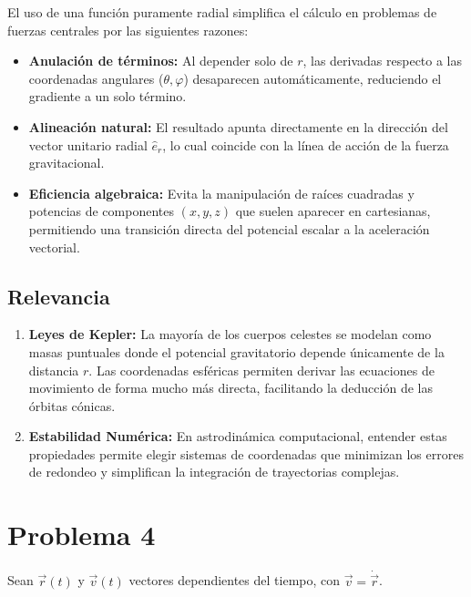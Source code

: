 \documentclass[12pt, letterpaper]{article}
\begin{document}
El uso de una función puramente radial simplifica el cálculo en problemas de fuerzas centrales por las siguientes razones:
\begin{itemize}
    \item \textbf{Anulación de términos:} Al depender solo de $r$, las derivadas respecto a las coordenadas angulares ($\theta, \varphi$) desaparecen automáticamente, reduciendo el gradiente a un solo término.
    \item \textbf{Alineación natural:} El resultado apunta directamente en la dirección del vector unitario radial $\hat{e}_r$, lo cual coincide con la línea de acción de la fuerza gravitacional.
    \item \textbf{Eficiencia algebraica:} Evita la manipulación de raíces cuadradas y potencias de componentes $(x, y, z)$ que suelen aparecer en cartesianas, permitiendo una transición directa del potencial escalar a la aceleración vectorial.
\end{itemize}

\subsection{Relevancia}

\begin{enumerate}
    \item \textbf{Leyes de Kepler:} La mayoría de los cuerpos celestes se modelan como masas puntuales donde el potencial gravitatorio depende únicamente de la distancia $r$. Las coordenadas esféricas permiten derivar las ecuaciones de movimiento de forma mucho más directa, facilitando la deducción de las órbitas cónicas.
    
    \item \textbf{Estabilidad Numérica:} En astrodinámica computacional, entender estas propiedades permite elegir sistemas de coordenadas que minimizan los errores de redondeo y simplifican la integración de trayectorias complejas.
\end{enumerate}


\section{Problema 4}

Sean $\vec{r}(t)$ y $\vec{v}(t)$ vectores dependientes del tiempo, con $\vec{v} = \dot{\vec{r}}$.
\end{document}
